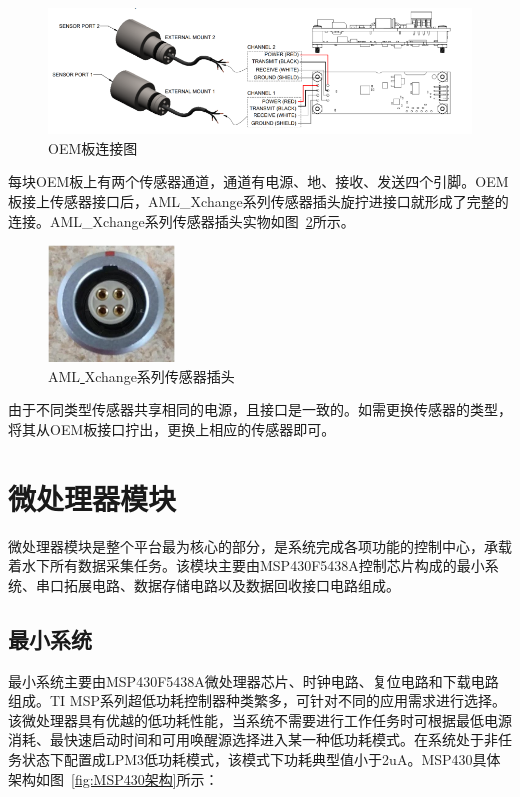 \begin{figure}[ht]
    \centering
	\includegraphics[width=\textwidth]{fig/OEM板连接图.png}
	\caption{OEM板连接图}
	\label{fig:OEM板连接图}
\end{figure}

每块OEM板上有两个传感器通道，通道有电源、地、接收、发送四个引脚。OEM板接上传感器接口后，AML\_Xchange系列传感器插头旋拧进接口就形成了完整的连接。AML\_Xchange系列传感器插头实物如图~\ref{fig:AMLXchange}所示。

\begin{figure}[ht]
    \centering
	\includegraphics[width=0.3\textwidth]{fig/AML_Xchange.png}
	\caption{AML\uline{ }Xchange系列传感器插头}
	\label{fig:AMLXchange}
\end{figure}

由于不同类型传感器共享相同的电源，且接口是一致的。如需更换传感器的类型，将其从OEM板接口拧出，更换上相应的传感器即可。

\section{微处理器模块}
微处理器模块是整个平台最为核心的部分，是系统完成各项功能的控制中心，承载着水下所有数据采集任务。该模块主要由MSP430F5438A控制芯片构成的最小系统、串口拓展电路、数据存储电路以及数据回收接口电路组成。
\subsection{最小系统}
最小系统主要由MSP430F5438A微处理器芯片、时钟电路、复位电路和下载电路组成。TI MSP系列超低功耗控制器种类繁多，可针对不同的应用需求进行选择。该微处理器具有优越的低功耗性能，当系统不需要进行工作任务时可根据最低电源消耗、最快速启动时间和可用唤醒源选择进入某一种低功耗模式。在系统处于非任务状态下配置成LPM3低功耗模式，该模式下功耗典型值小于2uA。MSP430具体架构如图~\ref{fig:MSP430架构}所示：

